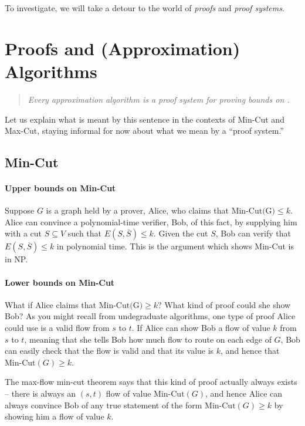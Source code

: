 \documentclass[11pt]{article}
\begin{document}
\noindent To investigate, we will take a detour to the world of \emph{proofs} and \emph{proof systems}.

\section{Proofs and (Approximation) Algorithms}
\begin{quote}
    \begin{center}
\emph{Every approximation algorithm is a proof system for proving bounds on .}
    \end{center}
\end{quote}
Let us explain what is meant by this sentence in the contexts of Min-Cut and Max-Cut, staying informal for now about what we mean by a ``proof system.'' 

\subsection{Min-Cut}
\paragraph{Upper bounds on Min-Cut} Suppose $G$ is a graph held by a prover, Alice, who claims that $\text{Min-Cut(G)} \leq k$.
Alice can convince a polynomial-time verifier, Bob, of this fact, by supplying him with a cut $S \subseteq V$ such that $E(S,\overline{S}) \leq k$.
Given the cut $S$, Bob can verify that $E(S,\overline{S}) \leq k$ in polynomial time. This is the argument which shows Min-Cut is in NP.

\paragraph{Lower bounds on Min-Cut} What if Alice claims that $\text{Min-Cut(G)} \geq k$? What kind of proof could she show Bob? 
As you might recall from undegraduate algorithms, one type of proof Alice could use is a valid flow from $s$ to $t$.
If Alice can show Bob a flow of value $k$ from $s$ to $t$, meaning that she tells Bob how much flow to route on each edge of $G$, Bob can easily check that the flow is valid and that its value is $k$, and hence that $\text{Min-Cut}(G) \geq k$.

The max-flow min-cut theorem says that this kind of proof actually always exists -- there is always an $(s,t)$ flow of value $\text{Min-Cut}(G)$, and hence Alice can always convince Bob of any true statement of the form $\text{Min-Cut}(G) \geq k$ by showing him a flow of value $k$.
\end{document}
